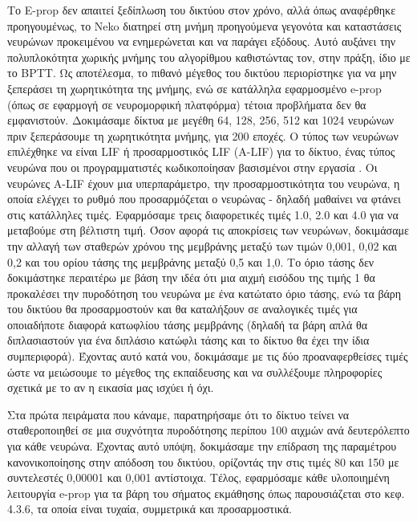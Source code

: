 \documentclass[12pt]{report}
\begin{document}
Το \textlatin{E-prop} δεν απαιτεί ξεδίπλωση του δικτύου στον χρόνο, αλλά όπως αναφέρθηκε προηγουμένως, το \textlatin{Neko} διατηρεί στη μνήμη προηγούμενα γεγονότα και καταστάσεις νευρώνων προκειμένου να ενημερώνεται και να παράγει εξόδους. Αυτό αυξάνει την πολυπλοκότητα χωρικής μνήμης του αλγορίθμου καθιστώντας τον, στην πράξη, ίδιο με το \textlatin{BPTT}. Ως αποτέλεσμα, το πιθανό μέγεθος του δικτύου περιορίστηκε για να μην ξεπεράσει τη χωρητικότητα της μνήμης, ενώ σε κατάλληλα εφαρμοσμένο \textlatin{e-prop} (όπως σε εφαρμογή σε νευρομορφική πλατφόρμα) τέτοια προβλήματα δεν θα εμφανιστούν. Δοκιμάσαμε δίκτυα με μεγέθη 64, 128, 256, 512 και 1024 νευρώνων πριν ξεπεράσουμε τη χωρητικότητα μνήμης, για 200 εποχές. Ο τύπος των νευρώνων επιλέχθηκε να είναι \textlatin{LIF} ή προσαρμοστικός \textlatin{LIF (A-LIF)} για το δίκτυο, ένας τύπος νευρώνα που οι προγραμματιστές κωδικοποίησαν βασισμένοι στην εργασία \cite{Bellec2020}. Οι νευρώνες \textlatin{A-LIF} έχουν μια υπερπαράμετρο, την προσαρμοστικότητα του νευρώνα, η οποία ελέγχει το ρυθμό που προσαρμόζεται ο νευρώνας - δηλαδή μαθαίνει να φτάνει στις κατάλληλες τιμές. Εφαρμόσαμε τρεις διαφορετικές τιμές 1.0, 2.0 και 4.0 για να μεταβούμε στη βέλτιστη τιμή. Όσον αφορά τις αποκρίσεις των νευρώνων, δοκιμάσαμε την αλλαγή των σταθερών χρόνου της μεμβράνης μεταξύ των τιμών 0,001, 0,02 και 0,2 και του ορίου τάσης της μεμβράνης μεταξύ 0,5 και 1,0. Το όριο τάσης δεν δοκιμάστηκε περαιτέρω με βάση την ιδέα ότι μια αιχμή εισόδου της τιμής 1 θα προκαλέσει την πυροδότηση του νευρώνα με ένα κατώτατο όριο τάσης, ενώ τα βάρη του δικτύου θα προσαρμοστούν και θα καταλήξουν σε αναλογικές τιμές για οποιαδήποτε διαφορά κατωφλίου τάσης μεμβράνης (δηλαδή τα βάρη απλά θα διπλασιαστούν για ένα διπλάσιο κατώφλι τάσης και το δίκτυο θα έχει την ίδια συμπεριφορά). Έχοντας αυτό κατά νου, δοκιμάσαμε με τις δύο προαναφερθείσες τιμές ώστε να μειώσουμε το μέγεθος της εκπαίδευσης και να συλλέξουμε πληροφορίες σχετικά με το αν η εικασία μας ισχύει ή όχι.

Στα πρώτα πειράματα που κάναμε, παρατηρήσαμε ότι το δίκτυο τείνει να σταθεροποιηθεί σε μια συχνότητα πυροδότησης περίπου 100 αιχμών ανά δευτερόλεπτο για κάθε νευρώνα. Έχοντας αυτό υπόψη, δοκιμάσαμε την επίδραση της παραμέτρου κανονικοποίησης στην απόδοση του δικτύου, ορίζοντάς την στις τιμές 80 και 150 με συντελεστές 0,00001 και 0,001 αντίστοιχα. Τέλος, εφαρμόσαμε κάθε υλοποιημένη λειτουργία \textlatin{e-prop} για τα βάρη του σήματος εκμάθησης όπως παρουσιάζεται στο κεφ. 4.3.6, τα οποία είναι τυχαία, συμμετρικά και προσαρμοστικά.
\end{document}
